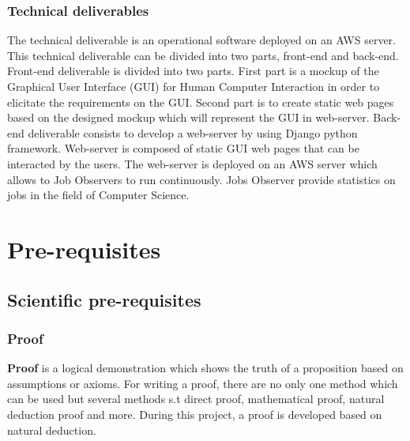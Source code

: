 \documentclass[conference,compsoc]{IEEEtran}
\begin{document}
\subsubsection{Technical deliverables}
The technical deliverable is an operational software deployed on an AWS server. This technical deliverable can be divided into two parts, front-end and back-end. 
\newline
Front-end deliverable is divided into two parts. First part is a mockup of the Graphical User Interface (GUI) for Human Computer Interaction in order to elicitate the requirements on the GUI. Second part is to create static web pages based on the designed mockup which will represent the GUI in web-server. 
\newline
Back-end deliverable consists to develop a web-server by using Django python framework. Web-server is composed of static GUI web pages that can be interacted by the users. The web-server is deployed on an AWS server which allows to Job Observers to run continuously. Jobs Observer provide statistics on jobs in the field of Computer Science.  


\section{Pre-requisites} 

\subsection{Scientific pre-requisites}
\subsubsection{Proof}
\textbf{Proof} is a logical demonstration which shows the truth of a proposition based on assumptions or axioms. For writing a proof, there are no only one method which can be used but several methods s.t direct proof, mathematical proof, natural deduction proof and more. During this project, a proof is developed based on natural deduction. 
\end{document}
